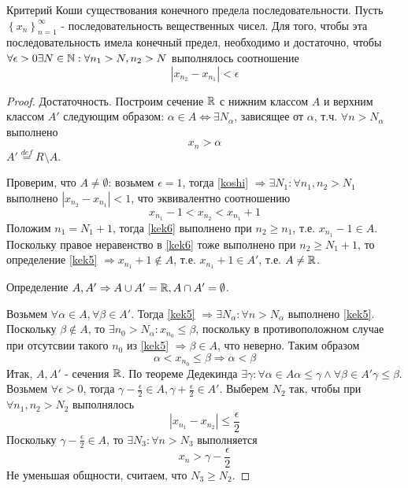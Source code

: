 \documentclass[main]{subfiles}
\begin{document}
\begin{theorem}
    Критерий Коши существования конечного предела последовательности.
    Пусть $\left\{x_n\right\}_{n = 1}^{\infty}$ - последовательность 
    вещественных чисел. Для того, чтобы эта последовательность имела 
    конечный предел, необходимо и достаточно, чтобы $\forall \epsilon > 0
    \exists N \in \mathbb{N} : \forall n_1 > N, n_2 > N$ выполнялось соотношение
    \begin{equation}\label{koshi}
        |x_{n_2} - x_{n_1}| < \epsilon
    \end{equation}
\end{theorem}
\begin{proof}
    Достаточность. Построим сечение $\mathbb{R}$ с нижним классом $A$ и верхним классом
    $A'$ следующим образом: $\alpha \in A \Leftrightarrow \exists N_\alpha$, 
    зависящее от $\alpha$, т.ч. $\forall n > N_\alpha$ выполнено 
    \begin{equation}\label{kek5}
        x_n > \alpha
    \end{equation}
    $A' \overset{def}{=} R \setminus A$.

    Проверим, что $A \neq \emptyset$: возьмем $\epsilon = 1$, тогда \ref{koshi}
    $\Rightarrow \exists N_1 : \forall n_1, n_2 > N_1$ выполнено
    $|x_{n_2} - x_{n_1}| < 1$, что эквивалентно соотношению 
    \begin{equation}\label{kek6}
        x_{n_1} - 1 < x_{n_2} < x_{n_1} + 1
    \end{equation}
    Положим $n_1 = N_1 + 1$, тогда \ref{kek6} выполнено при $n_2 \geq n_1$,
    т.е. $x_{n_1} - 1 \in A$. Поскольку правое неравенство в \ref{kek6} 
    тоже выполнено при $n_2 \geq N_1 + 1$, то определение \ref{kek5} 
    $\Rightarrow x_{n_1} + 1 \notin A$, т.е. $x_{n_1} + 1 \in A'$, т.е. 
    $A \neq \mathbb{R}$.

    Определение $A, A' \Rightarrow A \cup A' = \mathbb{R}, A \cap A' = \emptyset$.

    Возьмем $\forall \alpha \in A, \forall \beta \in A'$. Тогда \ref{kek5}
    $\Rightarrow \exists N_\alpha : \forall n > N_\alpha$ выполнено \ref{kek5}.
    Поскольку $\beta \notin A$, то $\exists n_0 > N_\alpha : x_{n_0} \leq \beta$,
    поскольку в противоположном случае при отсутсвии такого $n_0$ из \ref{kek5}
    $\Rightarrow \beta \in A$, что неверно. Таким образом 
    \[\alpha < x_{n_0} \leq \beta \Rightarrow \alpha < \beta\]
    Итак, $A, A'$ - сечения $\mathbb{R}$. По теореме Дедекинда $\exists \gamma:
    \forall \alpha \in A \alpha \leq \gamma \wedge \forall \beta \in A' 
    \gamma \leq \beta$. Возьмем $\forall \epsilon > 0$, тогда $\gamma - 
    \frac{\epsilon}{2} \in A, \gamma + \frac{\epsilon}{2} \in A'$. 
    Выберем $N_2$ так, чтобы при $\forall n_1, n_2 > N_2$ выполнялось
    \begin{equation}\label{kek7}
        |x_{n_1} - x_{n_2}| \leq \frac{\epsilon}{2}
    \end{equation}
    Поскольку $\gamma -  \frac{\epsilon}{2} \in A$, то $\exists N_3 : 
    \forall n > N_3$ выполняется 
    \begin{equation}\label{kek8}
        x_n > \gamma - \frac{\epsilon}{2}
    \end{equation}
    Не уменьшая общности, считаем, что $N_3 \geq N_2$.


\end{proof}
\end{document}
